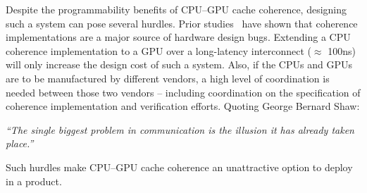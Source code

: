 
Despite the programmability benefits of CPU--GPU cache coherence, designing such
a system can pose several hurdles. Prior
studies~\cite{Hong2012,Vantrease:2011:ACL:2014698.2014902} have shown
that coherence implementations are a major source of hardware design bugs.
Extending a CPU coherence implementation to a GPU over a long-latency
interconnect ($\approx$ 100ns)  will only increase the design cost of such a
system.  Also, if the CPUs and GPUs are to be manufactured by different vendors,
a high level of coordination is needed between those two vendors --
including coordination on the specification of coherence implementation and
verification efforts. Quoting George Bernard Shaw:

\begin{centering}
\textit{``The single biggest problem in communication is the illusion it has already
taken place.''}
\end{centering}
Such hurdles make CPU--GPU cache coherence an unattractive option to
deploy in a product.

